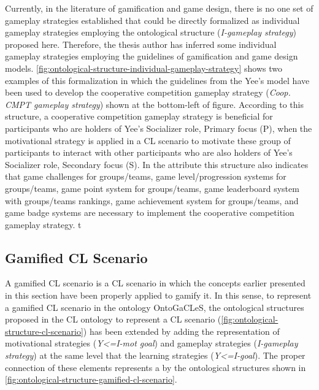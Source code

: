Currently, in the literature of gamification and game design, there is no one set of gameplay strategies established that could be directly formalized as individual gameplay strategies employing the ontological structure (\emph{I-gameplay strategy}) proposed here.
Therefore, the thesis author has inferred some individual gameplay strategies employing the guidelines of gamification and game design models.
\autoref{fig:ontological-structure-individual-gameplay-strategy} shows two examples of this formalization in which the guidelines from the Yee's model \cite{Yee2006} have been used to develop the cooperative competition gameplay strategy (\emph{Coop. CMPT gameplay strategy}) shown at the bottom-left of figure.
According to this structure, a cooperative competition gameplay strategy is beneficial for participants who are holders of Yee's Socializer role, Primary focus (P), when the motivational strategy  is applied in a CL scenario to motivate these group of participants to interact with other participants who are also holders of Yee's Socializer role, Secondary focus (S).
In the attribute  this structure also indicates that game challenges for groups/teams, game level/progression systems for groups/teams, game point system for groups/teams, game leaderboard system with groups/teams rankings, game achievement system for groups/teams, and game badge systems are necessary to implement the cooperative competition gameplay strategy.
t
\subsection{Gamified CL Scenario}
\label{subsec:gamified-cl-scenario}

A gamified CL scenario is a CL scenario in which the concepts earlier presented in this section have been properly applied to gamify it.
In this sense, to represent a gamified CL scenario in the ontology OntoGaCLeS, the ontological structures proposed in the CL ontology to represent a CL scenario (\autoref{fig:ontological-structure-cl-scenario}) has been extended by adding the representation of motivational strategies (\emph{Y<=I-mot goal}) and gameplay strategies (\emph{I-gameplay strategy}) at the same level that the learning strategies (\emph{Y<=I-goal}).
The proper connection of these elements represents a  by the ontological structures shown in \autoref{fig:ontological-structure-gamified-cl-scenario}.

